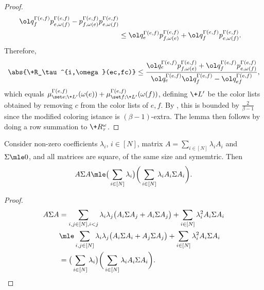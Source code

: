 \documentclass[a4paper,11pt]{article}
\begin{document}
\begin{proof}
\begin{align*}
{         \ol q^{\Gamma(e,f)}_f p^{\Gamma(e, f)}_{e, \omega(f)} -
         p^{\Gamma(e, f)}_{f, \omega(e)} p^{\Gamma(e, f)}_{e, \omega(f)} }
    \\&\le 
         \ol q^{\Gamma(e,f)}_e p^{\Gamma(e, f)}_{f, \omega(e)} +
         \ol q^{\Gamma(e,f)}_f p^{\Gamma(e, f)}_{e, \omega(f)}.
    \end{align*}
    Therefore,
	\begin{align*}
		\abs{\+R_\tau^{i,\omega}(ec,fc)} \le
        \frac{
         \ol q^{\Gamma(e,f)}_e p^{\Gamma(e, f)}_{f, \omega(e)} +
         \ol q^{\Gamma(e,f)}_f p^{\Gamma(e, f)}_{e, \omega(f)}
        }{
        \ol q^{\Gamma(e,f)}_e \ol q^{\Gamma(e,f)}_f - \ol q^{\Gamma(e,f)}_{ef}
        },
	\end{align*}
    which equals 
    $\mu^{\Gamma(e, f)}_{\set e;\+L'}(\omega(e)) + \mu^{\Gamma(e, f)}_{\set f;\+L'}(\omega(f))$,
    defining $\+L'$ be the color lists obtained by removing $c$ from the color lists of $e, f$.
    By , this is bounded by $\frac{2}{\beta-1}$
    since the modified coloring istance is $(\beta-1)$-extra.
    The lemma then follows by doing a row summation to $\+R_\tau^\omega$.
\end{proof}

\begin{proposition}\label{prop:matrix-sq-coeff}
    Consider non-zero coefficients $\lambda_i$, $i\in [N]$, matrix $A = \sum_{i\in [N]}\lambda_i A_i$ and 
    $\Sigma\mle 0$, and all matrices are square, of the same size and symemtric. Then
    \[
    A\Sigma A \mle
    \big(\sum_{i\in [N]} \lambda_i\big)
    \bigg( \sum_{i\in [N]}\lambda_i A_i\Sigma A_i \bigg).
    \]
\end{proposition}
\begin{proof}
    \begin{align*}
    A\Sigma A &= \sum_{i, j\in [N], i < j} \lambda_i\lambda_j \big( A_i\Sigma A_j + A_i\Sigma A_j \big)
               + \sum_{i\in [N]}\lambda_i^2 A_i\Sigma A_i
    \\& \mle \sum_{i, j\in [N]} \lambda_i\lambda_j\big( A_i\Sigma A_i + A_j\Sigma A_j \big)
               + \sum_{i\in [N]}\lambda_i^2 A_i\Sigma A_i
    \\& = 
    \big(\sum_{i\in [N]} \lambda_i\big)
    \bigg( \sum_{i\in [N]}\lambda_i A_i\Sigma A_i \bigg).
    \end{align*}
\end{proof}
\end{document}
